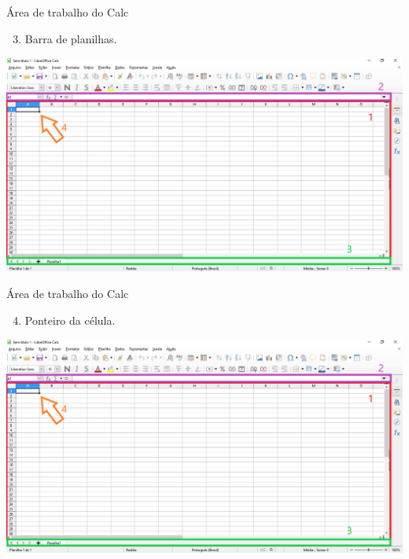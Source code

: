 \begin{frame}{Área de trabalho do Calc}
	\begin{block}{}
		\begin{enumerate}
			\setcounter{enumi}{2}
			\item Barra de planilhas.
		\end{enumerate}
	\end{block}
	
	\centering
	\includegraphics[width=0.95\linewidth]{Figuras/Ch06/fig2}
\end{frame}


\begin{frame}{Área de trabalho do Calc}
	\begin{block}{}
		\begin{enumerate}
			\setcounter{enumi}{3}
			\item Ponteiro da célula.
		\end{enumerate}
	\end{block}
	
	\centering
	\includegraphics[width=0.95\linewidth]{Figuras/Ch06/fig2}
\end{frame}


